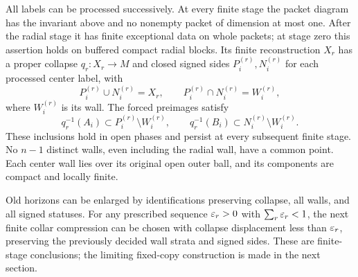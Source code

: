 \begin{proposition}\label{countable:construction}
All labels can be processed successively. At every finite stage the
packet diagram has the invariant above and no nonempty packet of
dimension at most one. After the radial stage it has finite exceptional
data on whole packets; at stage zero this assertion holds on buffered
compact radial blocks.
Its finite reconstruction $X_r$ has a proper collapse $q_r:X_r\to M$
and closed signed sides $P_i^{(r)},N_i^{(r)}$ for each processed center
label, with
\[
 P_i^{(r)}\cup N_i^{(r)}=X_r,\qquad
 P_i^{(r)}\cap N_i^{(r)}=W_i^{(r)},
\]
where $W_i^{(r)}$ is its wall. The forced preimages satisfy
\[
 q_r^{-1}(A_i)\subset P_i^{(r)}\setminus W_i^{(r)},\qquad
 q_r^{-1}(B_i)\subset N_i^{(r)}\setminus W_i^{(r)}.
\]
These inclusions hold in open phases and persist at every subsequent
finite stage. No $n-1$ distinct walls, even including the radial wall,
have a common point. Each center wall lies over its original open
outer ball, and its components are compact and locally finite.

Old horizons can be enlarged by identifications preserving collapse,
all walls, and all signed statuses. For any prescribed sequence
$\varepsilon_r>0$ with $\sum_r\varepsilon_r<1$, the next finite collar compression
can be chosen with collapse displacement less than $\varepsilon_r$, preserving
the previously decided wall strata and signed sides. These are
finite-stage conclusions; the limiting fixed-copy construction is
made in the next section.
\end{proposition}


